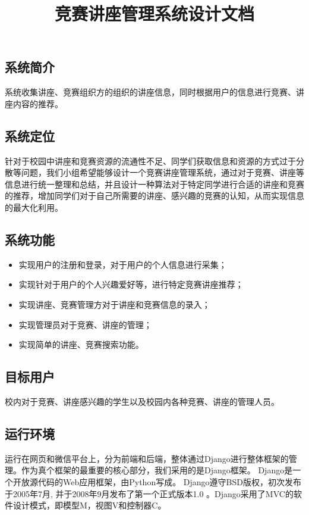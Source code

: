 \documentclass[UTF8]{ctexart}
\date{}
\title{\textbf{竞赛讲座管理系统设计文档}}
\author{\rightline{SigmaGo小组}}
\begin{document}
\begin{spacing}{1.3}
\maketitle



\subsection{系统简介}
系统收集讲座、竞赛组织方的组织的讲座信息，同时根据用户的信息进行竞赛、讲座内容的推荐。

\subsection{系统定位}
针对于校园中讲座和竞赛资源的流通性不足、同学们获取信息和资源的方式过于分散等问题，我们小组希望能够设计一个竞赛讲座管理系统，通过对于竞赛、讲座等信息进行统一整理和总结，并且设计一种算法对于特定同学进行合适的讲座和竞赛的推荐，增加同学们对于自己所需要的讲座、感兴趣的竞赛的认知，从而实现信息的最大化利用。



\subsection{系统功能}
\begin{itemize}
    \item 实现用户的注册和登录，对于用户的个人信息进行采集；
    
    \item 实现针对于用户的个人兴趣爱好等，进行特定竞赛讲座推荐；
    
    \item 实现讲座、竞赛管理方对于讲座和竞赛信息的录入；
    
    \item 实现管理员对于竞赛、讲座的管理；
    
    \item 实现简单的讲座、竞赛搜索功能。
\end{itemize}


\subsection{目标用户}
校内对于竞赛、讲座感兴趣的学生以及校园内各种竞赛、讲座的管理人员。

\subsection{运行环境}
运行在网页和微信平台上，分为前端和后端，整体通过Django进行整体框架的管理。作为真个框架的最重要的核心部分，我们采用的是Django框架。 Django是一个开放源代码的Web应用框架，由Python写成。 Django遵守BSD版权，初次发布于2005年7月, 并于2008年9月发布了第一个正式版本1.0 。Django采用了MVC的软件设计模式，即模型M，视图V和控制器C。


\end{spacing}
\end{document}
